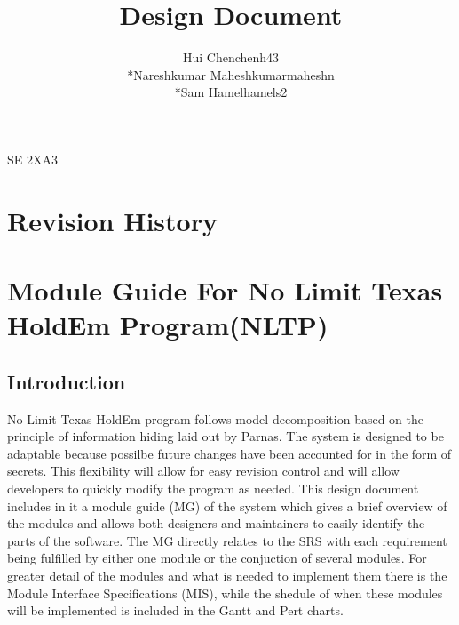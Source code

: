 \documentclass[11pt]{article}
\begin{document}
    \begin{titlepage}
    \title {Design Document}
    \maketitle
        \begin{center}
		SE 2XA3\\
		\author{
		Hui Chen\hspace{128pt}chenh43	
		\\*Nareshkumar Maheshkumar\hspace{35pt}maheshn 
		\\*Sam Hamel\hspace{118pt}hamels2 \\
		}
		\end{center}
    \end{titlepage}
    
    \newpage
    
    \tableofcontents
    \listoffigures
    \listoftables
    
    \newpage
    \section{Revision History}
    \section{Module Guide For No Limit Texas HoldEm Program(NLTP)}
    \subsection{Introduction}
    No Limit Texas HoldEm program follows model decomposition based on the principle of information hiding laid out by Parnas. The system is designed to be adaptable because possilbe future changes have been accounted for in the form of secrets. This flexibility will allow for easy revision control and will allow developers to quickly modify the program as needed. This design document includes in it a module guide (MG) of the system which gives a brief overview of the modules and allows both designers and maintainers to easily identify the parts of the software. The MG directly relates to the SRS with each requirement being fulfilled by either one module or the conjuction of several modules. For greater detail of the modules and what is needed to implement them there is the Module Interface Specifications (MIS), while the shedule of when these modules will be implemented is included in the Gantt and Pert charts.
\end{document}
